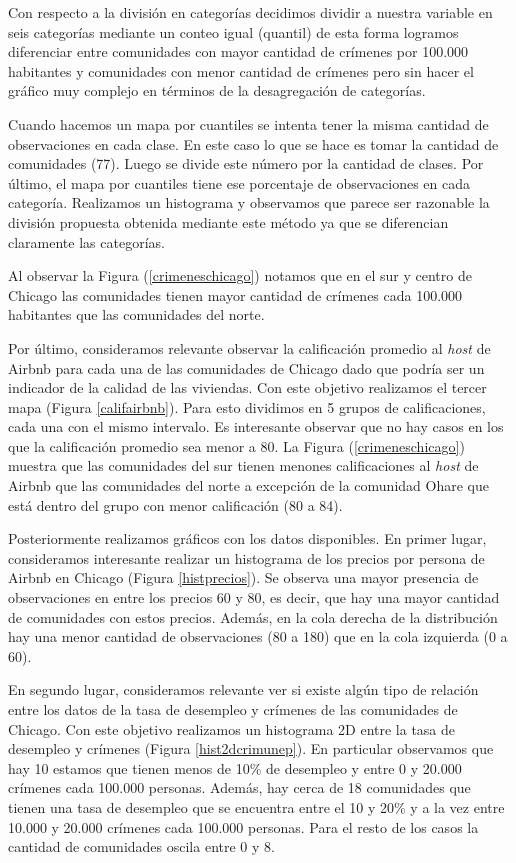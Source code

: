 \documentclass[12pt]{article}
\begin{document}
Con respecto a la división en categorías decidimos dividir a nuestra variable en seis categorías mediante un conteo igual (quantil) de esta forma logramos diferenciar entre comunidades con mayor cantidad de crímenes por 100.000 habitantes y comunidades con menor cantidad de crímenes pero sin hacer el gráfico muy complejo en términos de la desagregación de categorías. 


Cuando hacemos un mapa por cuantiles se intenta tener la misma cantidad de observaciones en cada clase. En este caso lo que se hace es tomar la cantidad de comunidades (77). Luego se divide este número por la cantidad de clases. Por último, el mapa por cuantiles tiene ese porcentaje de observaciones en cada categoría. Realizamos un histograma y observamos que parece ser razonable la división propuesta obtenida mediante este método ya que se diferencian claramente las categorías. 


Al observar la Figura (\ref{crimeneschicago}) notamos que en el sur y centro de Chicago las comunidades tienen mayor cantidad de crímenes cada 100.000 habitantes que las comunidades del norte.

Por último, consideramos relevante observar la calificación promedio al \textit{host} de Airbnb para cada una de las comunidades de Chicago dado que podría ser un indicador de la calidad de las viviendas. Con este objetivo realizamos el tercer mapa (Figura \ref{califairbnb}). Para esto dividimos en 5 grupos de calificaciones, cada una con el mismo intervalo. Es interesante observar que no hay casos en los que la calificación promedio sea menor a 80. La Figura (\ref{crimeneschicago}) muestra que las comunidades del sur tienen menones calificaciones al \textit{host} de Airbnb que las comunidades del norte a excepción de la comunidad Ohare que está dentro del grupo con menor calificación (80 a 84). 


Posteriormente realizamos gráficos con los datos disponibles. En primer lugar, consideramos interesante realizar un histograma de los precios por persona de Airbnb en Chicago (Figura \ref{histprecios}). Se observa una mayor presencia de observaciones en entre los precios 60 y 80, es decir, que hay una mayor cantidad de comunidades con estos precios. Además, en la cola derecha de la distribución hay una menor cantidad de observaciones (80 a 180) que en la cola izquierda (0 a 60).


En segundo lugar, consideramos relevante ver si existe algún tipo de relación entre los datos de la tasa de desempleo y crímenes de las comunidades de Chicago. Con este objetivo realizamos un histograma 2D entre la tasa de desempleo y crímenes (Figura \ref{hist2dcrimunep}). En particular observamos que hay 10 estamos que tienen menos de 10\% de desempleo y entre 0 y 20.000 crímenes cada 100.000 personas. Además, hay cerca de 18 comunidades que tienen una tasa de desempleo que se encuentra entre el 10 y 20\% y a la vez entre 10.000 y 20.000 crímenes cada 100.000 personas. Para el resto de los casos la cantidad de comunidades oscila entre 0 y 8. 
\end{document}
